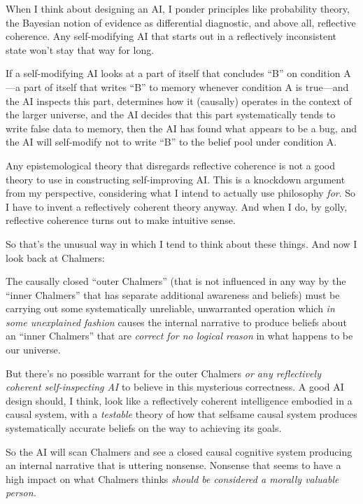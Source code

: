 {
 When I think about designing an AI, I ponder principles like
probability theory, the Bayesian notion of evidence as differential
diagnostic, and above all, reflective coherence. Any self-modifying AI
that starts out in a reflectively inconsistent state
won't stay that way for long.}

{
 If a self-modifying AI looks at a part of itself that concludes
``B'' on condition A---a part of
itself that writes ``B'' to memory
whenever condition A is true---and the AI inspects this part,
determines how it (causally) operates in the context of the larger
universe, and the AI decides that this part systematically tends to
write false data to memory, then the AI has found what appears to be a
bug, and the AI will self-modify not to write
``B'' to the belief pool under
condition A.}

{
 Any epistemological theory that disregards reflective coherence is
not a good theory to use in constructing self-improving AI. This is a
knockdown argument from my perspective, considering what I intend to
actually use philosophy \textit{for}. So I have to invent a
reflectively coherent theory anyway. And when I do, by golly,
reflective coherence turns out to make intuitive sense.}

{
 So that's the unusual way in which I tend to think
about these things. And now I look back at Chalmers:}

{
 The causally closed ``outer
Chalmers'' (that is not influenced in any way by the
``inner Chalmers'' that has separate
additional awareness and beliefs) must be carrying out some
systematically unreliable, unwarranted operation which \textit{in some
unexplained fashion} causes the internal narrative to produce beliefs
about an ``inner Chalmers'' that are
\textit{correct for no logical reason} in what happens to be our
universe.}

{
 But there's no possible warrant for the outer
Chalmers \textit{or any reflectively coherent self-inspecting AI} to
believe in this mysterious correctness. A good AI design should, I
think, look like a reflectively coherent intelligence embodied in a
causal system, with a \textit{testable} theory of how that selfsame
causal system produces systematically accurate beliefs on the way to
achieving its goals.}

{
 So the AI will scan Chalmers and see a closed causal cognitive
system producing an internal narrative that is uttering nonsense.
Nonsense that seems to have a high impact on what Chalmers thinks
\textit{should be considered a morally valuable person.}}


